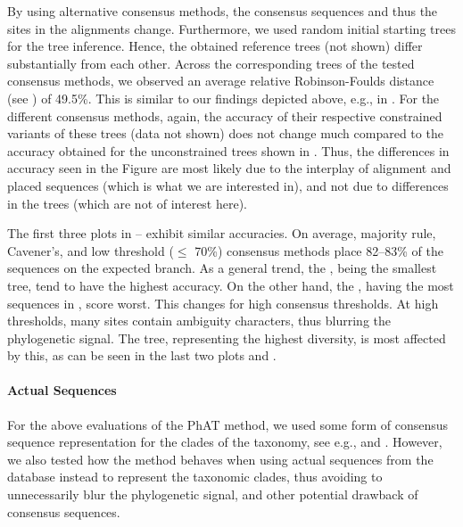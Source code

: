 By using alternative consensus methods, the consensus sequences and thus the sites in the alignments change.
Furthermore, we used random initial starting trees for the tree inference.
Hence, the obtained reference trees (not shown) differ substantially from each other.
Across the corresponding trees of the tested consensus methods,
we observed an average relative Robinson-Foulds distance \citep{Robinson1981}
(see ) of 49.5\%.
This is similar to our findings depicted above, e.g., in .
For the different consensus methods, again,
the accuracy of their respective constrained variants of these trees (data not shown)
does not change much compared to the accuracy obtained for the unconstrained trees shown in .
Thus, the differences in accuracy seen in the Figure are most likely due to
the interplay of alignment and placed sequences (which is what we are interested in),
and not due to differences in the trees (which are not of interest here).

The first three plots in --
exhibit similar accuracies.
On average, majority rule, Cavener's, and low threshold ($\leq$ 70\%) consensus methods
place 82--83\% of the sequences on the expected branch.
As a general trend, the , being the smallest tree, tend to have the highest accuracy.
On the other hand, the , having the most sequences in , score worst.
This changes for high consensus thresholds. %
At high thresholds, many sites contain ambiguity characters, thus blurring the phylogenetic signal.
The  tree, representing the highest diversity, is most affected by this,
as can be seen in the last two plots 
and .

\paragraph{Actual Sequences}
\label{ch:AutomaticTrees:sec:Evaluation:sub:Accuracy:par:SingleSequences}

For the above evaluations of the \ac{PhAT} method,
we used some form of consensus sequence representation for the clades of the taxonomy,
see e.g.,  and .
However, we also tested how the method behaves when using actual sequences from the database instead
to represent the taxonomic clades,
thus avoiding to unnecessarily blur the phylogenetic signal,
and other potential drawback of consensus sequences.

